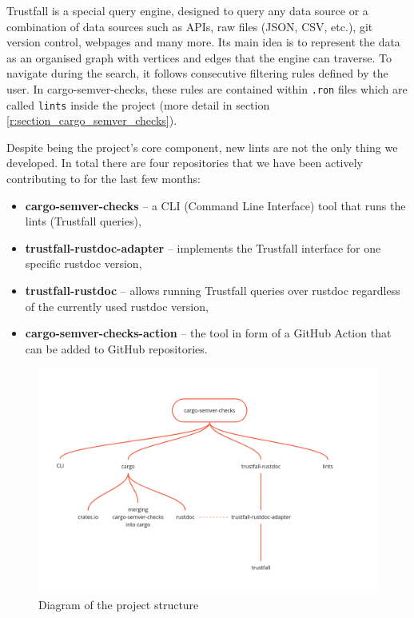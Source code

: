 \documentclass[licencjacka,en]{pracamgr}
\begin{document}
Trustfall is a special query engine, designed to query any data source or a combination of data
sources such as APIs, raw files (JSON, CSV, etc.), git version control, webpages and many more.
Its main idea is to represent the data as an organised graph with vertices and edges that the
engine can traverse. To navigate during the search, it follows consecutive filtering rules defined
by the user. In cargo-semver-checks, these rules are contained within \texttt{.ron} files which
are called \texttt{lints} inside the project (more detail in section
\ref{r:section_cargo_semver_checks}).

Despite being the project's core component, new lints are not the only thing we developed. In total
there are four repositories that we have been actively contributing to for the last few months:
\begin{itemize}
	\item \textbf{cargo-semver-checks} -- a CLI (Command Line Interface) tool that runs the lints
		(Trustfall queries),
	\item \textbf{trustfall-rustdoc-adapter} -- implements the Trustfall interface for one specific
		rustdoc version,
	\item \textbf{trustfall-rustdoc} -- allows running Trustfall queries over rustdoc regardless of
		the currently used rustdoc version,
	\item \textbf{cargo-semver-checks-action} -- the tool in form of a GitHub Action that can
	    be added to GitHub repositories.
\end{itemize}

\begin{figure}[h]
	\centering
	\caption{Diagram of the project structure}
	\includegraphics[width=\linewidth]{project-structure-diagram.png}
\end{figure}
\end{document}
